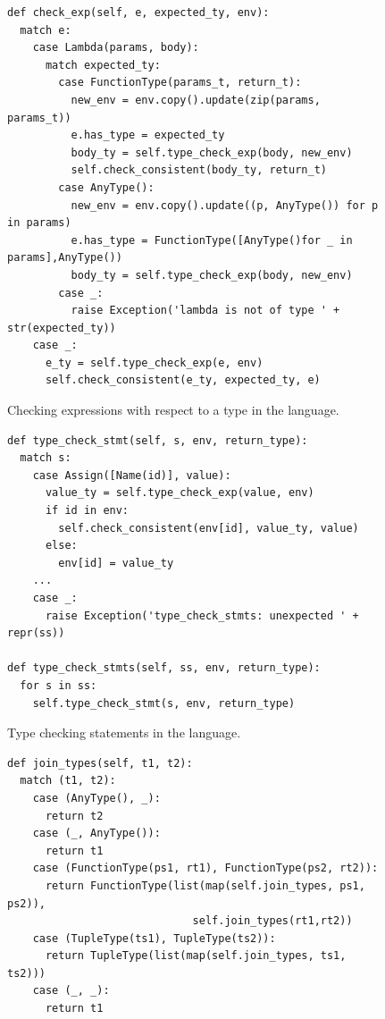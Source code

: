 \documentclass[7x10]{TimesAPriori_MIT}%
\numberwithin{theorem}{chapter}
\numberwithin{definition}{chapter}
\numberwithin{equation}{chapter}
\begin{document}
{\begin{figure}[tbp]
\begin{tcolorbox}[colback=white]  
\begin{lstlisting}
def check_exp(self, e, expected_ty, env):
  match e:
    case Lambda(params, body):
      match expected_ty:
        case FunctionType(params_t, return_t):
          new_env = env.copy().update(zip(params, params_t))
          e.has_type = expected_ty
          body_ty = self.type_check_exp(body, new_env)
          self.check_consistent(body_ty, return_t)
        case AnyType():
          new_env = env.copy().update((p, AnyType()) for p in params)
          e.has_type = FunctionType([AnyType()for _ in params],AnyType())
          body_ty = self.type_check_exp(body, new_env)
        case _:
          raise Exception('lambda is not of type ' + str(expected_ty))
    case _:
      e_ty = self.type_check_exp(e, env)
      self.check_consistent(e_ty, expected_ty, e)
\end{lstlisting}
\end{tcolorbox}
\caption{Checking expressions with respect to a type in the \LangGrad{} language.}
\label{fig:type-check-Lgradual-2}
\end{figure}

\begin{figure}[tbp]
\begin{tcolorbox}[colback=white]
\begin{lstlisting}
def type_check_stmt(self, s, env, return_type):
  match s:
    case Assign([Name(id)], value):
      value_ty = self.type_check_exp(value, env)
      if id in env:
        self.check_consistent(env[id], value_ty, value)
      else:
        env[id] = value_ty
    ...
    case _:
      raise Exception('type_check_stmts: unexpected ' + repr(ss))

def type_check_stmts(self, ss, env, return_type):
  for s in ss:
    self.type_check_stmt(s, env, return_type)
\end{lstlisting}
\end{tcolorbox}
\caption{Type checking statements in the \LangGrad{} language.}
\label{fig:type-check-Lgradual-3}
\end{figure}

\clearpage

\begin{figure}[tbp]
\begin{tcolorbox}[colback=white]  
\begin{lstlisting}
def join_types(self, t1, t2):
  match (t1, t2):
    case (AnyType(), _):
      return t2
    case (_, AnyType()):
      return t1
    case (FunctionType(ps1, rt1), FunctionType(ps2, rt2)):
      return FunctionType(list(map(self.join_types, ps1, ps2)),
                             self.join_types(rt1,rt2))
    case (TupleType(ts1), TupleType(ts2)):
      return TupleType(list(map(self.join_types, ts1, ts2)))
    case (_, _):
      return t1


\end{lstlisting}
\end{tcolorbox}
\end{figure}}
\end{document}
